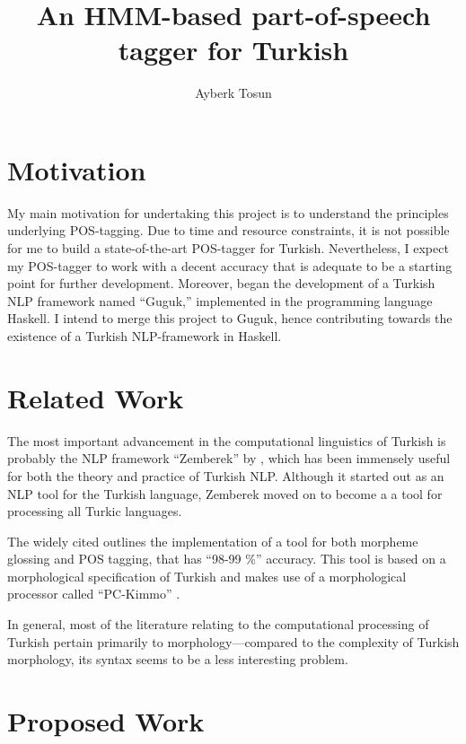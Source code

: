 \documentclass{article}
\title{\bf An HMM-based part-of-speech tagger for Turkish}
\author{Ayberk Tosun}
\date{}
\begin{document}
\maketitle

\section{Motivation}
\label{sec:motivation}
My main motivation for undertaking this project is to understand the
principles underlying POS-tagging. Due to time and resource constraints, it is
not possible for me to build a state-of-the-art POS-tagger for
Turkish. Nevertheless, I expect my POS-tagger
to work with a decent accuracy that is adequate to be a starting point for
further development. Moreover, \citet{Korkut2015} began the development of a
Turkish NLP framework named ``Guguk,'' implemented in the programming language Haskell. I intend
to merge this project to Guguk, hence contributing towards
the existence of a Turkish NLP-framework in Haskell.

\section{Related Work}
\label{sec:related_work}

The most important advancement in the computational linguistics of Turkish is
probably the NLP framework ``Zemberek'' by \citet{akin2007zemberek}, which has been
immensely useful for both the theory and practice of Turkish NLP. Although it started
out as an NLP tool for the Turkish language, Zemberek moved on to become a
a tool for processing all Turkic languages.

The widely cited \citet{oflazer1994tagging} outlines the implementation of a
tool for both morpheme glossing and POS tagging, that has ``98-99 \%'' accuracy. This
tool is based on a morphological specification of Turkish and makes use of a
morphological processor called ``PC-Kimmo'' \citep{antworth1991pc}.

In general, most of the literature relating to the computational processing of Turkish
pertain primarily to morphology---compared to the complexity of Turkish
morphology, its syntax seems to be a less interesting problem.
\section{Proposed Work}
\end{document}
